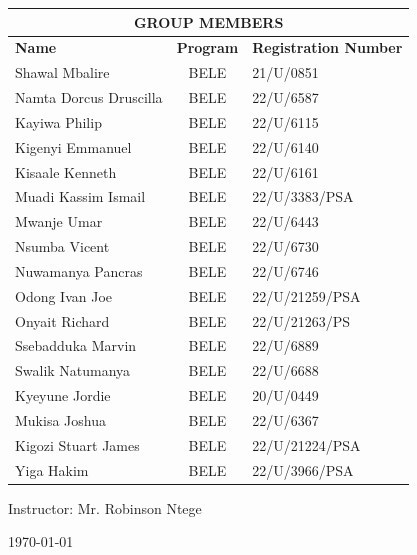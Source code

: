 \documentclass[12pt,a4paper]{report}
\begin{document}
\begin{titlepage}
\begin{center}
        \begin{table}[h!]
            \centering
            \begin{tabular}{|l|c|l|}
                \hline
                \multicolumn{3}{|c|}{\textbf{GROUP MEMBERS}} \\
                \hline
                \textbf{Name} & \textbf{Program} & \textbf{Registration Number} \\
                \hline
                Shawal Mbalire  & BELE & 21/U/0851 \\
                Namta Dorcus Druscilla & BELE & 22/U/6587 \\
                Kayiwa Philip & BELE & 22/U/6115 \\
                Kigenyi Emmanuel & BELE & 22/U/6140 \\
                Kisaale Kenneth & BELE & 22/U/6161 \\
                Muadi Kassim Ismail & BELE & 22/U/3383/PSA \\
                Mwanje Umar & BELE & 22/U/6443 \\
                Nsumba Vicent & BELE & 22/U/6730 \\
                Nuwamanya Pancras & BELE & 22/U/6746 \\
                Odong Ivan Joe & BELE & 22/U/21259/PSA \\
                Onyait Richard & BELE & 22/U/21263/PS \\
                Ssebadduka Marvin & BELE & 22/U/6889 \\
                Swalik Natumanya & BELE & 22/U/6688 \\
                Kyeyune Jordie & BELE & 20/U/0449 \\
                Mukisa Joshua & BELE & 22/U/6367 \\
                Kigozi Stuart James & BELE & 22/U/21224/PSA \\
                Yiga Hakim & BELE & 22/U/3966/PSA \\
                \hline
            \end{tabular}
        \end{table}
       
        \vspace{20pt}

        \normalsize Instructor: Mr. Robinson Ntege\\
        \vspace{10pt}

        \normalsize \today
        \vspace{20pt}

    \end{center}
\end{titlepage}
\end{document}

